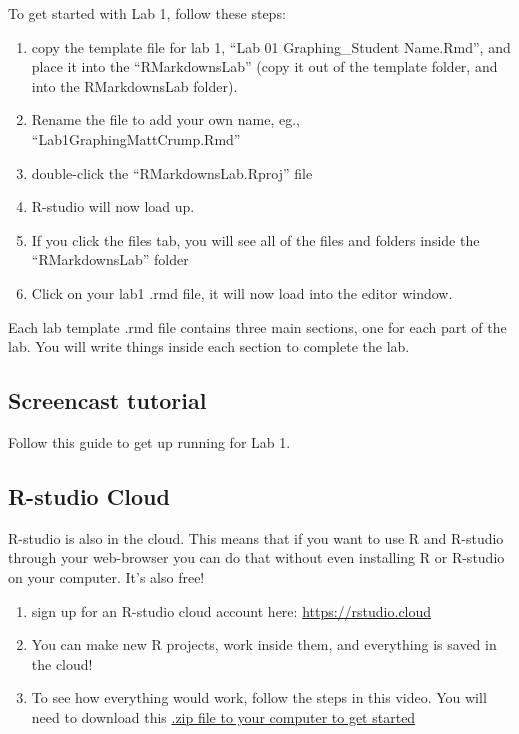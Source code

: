 \documentclass[
]{book}
\providecommand{\tightlist}{%
  \setlength{\itemsep}{0pt}\setlength{\parskip}{0pt}}
\begin{document}
To get started with Lab 1, follow these steps:

\begin{enumerate}
\def\labelenumi{\arabic{enumi}.}
\tightlist
\item
  copy the template file for lab 1, ``Lab 01 Graphing\_Student Name.Rmd'', and place it into the ``RMarkdownsLab'' (copy it out of the template folder, and into the RMarkdownsLab folder).
\item
  Rename the file to add your own name, eg., ``Lab1GraphingMattCrump.Rmd''
\item
  double-click the ``RMarkdownsLab.Rproj'' file
\item
  R-studio will now load up.
\item
  If you click the files tab, you will see all of the files and folders inside the ``RMarkdownsLab'' folder
\item
  Click on your lab1 .rmd file, it will now load into the editor window.
\end{enumerate}

Each lab template .rmd file contains three main sections, one for each part of the lab. You will write things inside each section to complete the lab.

\hypertarget{screencast-tutorial}{%
\subsection{Screencast tutorial}\label{screencast-tutorial}}

Follow this guide to get up running for Lab 1.

\hypertarget{r-studio-cloud}{%
\subsection{R-studio Cloud}\label{r-studio-cloud}}

R-studio is also in the cloud. This means that if you want to use R and R-studio through your web-browser you can do that without even installing R or R-studio on your computer. It's also free!

\begin{enumerate}
\def\labelenumi{\arabic{enumi}.}
\item
  sign up for an R-studio cloud account here: \url{https://rstudio.cloud}
\item
  You can make new R projects, work inside them, and everything is saved in the cloud!
\item
  To see how everything would work, follow the steps in this video. You will need to download this \href{https://github.com/CrumpLab/statisticsLab/raw/master/RstudioCloud.zip}{.zip file to your computer to get started}
\end{enumerate}
\end{document}

